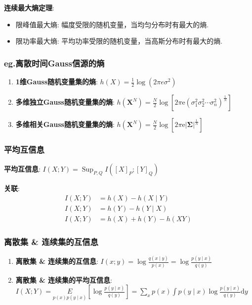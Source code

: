 \documentclass{article}
\begin{document}
            \textbf{连续最大熵定理}:
                \begin{itemize}
                    \item 限峰值最大熵: 幅度受限的随机变量，当均匀分布时有最大的熵.
                    \item 限功率最大熵: 平均功率受限的随机变量，当高斯分布时有最大的熵.
                \end{itemize}
            
        \subsubsection{\textbf{eg.}离散时间Gauss信源的熵}
            \begin{enumerate}
                \item \textbf{1维Gauss随机变量集的熵}: $h(X)=\frac{1}{2} \log \left(2 \pi e \sigma^{2}\right)$
                \item \textbf{多维独立Gauss随机变量集的熵}: $h\left(\boldsymbol{X}^{N}\right)=\frac{N}{2} \log \left[2 \pi \mathrm{e}\left(\sigma_{1}^{2} \sigma_{2}^{2} \cdots \sigma_{n}^{2}\right)^{\frac{1}{N}}\right]$
                \item \textbf{多维相关Gauss随机变量集的熵}: $h\left(\boldsymbol{X}^{N}\right)=\frac{N}{2} \log \left[2 \pi \mathrm{e} |\boldsymbol \Sigma|^{\frac{1}{N}}\right]$
            \end{enumerate}
            
        \subsubsection{平均互信息}
            \textbf{平均互信息}: $I(X ; Y)=\operatorname{Sup}_{P, Q} I\left([X]_{P} ;[Y]_{Q}\right)$
            
            \textbf{关联}:
                \begin{align*}
                    I(X ; Y) &= h(X)-h(X \mid Y) \\
                    I(X ; Y) &= h(Y)-h(Y \mid X) \\
                    I(X ; Y) &= h(X)+h(Y)-h(X Y)
                \end{align*}
                
        \subsubsection{离散集 \& 连续集的互信息}
            \begin{enumerate}
                \item \textbf{离散集 \& 连续集的互信息}: $I(x ; y)=\log \frac{q(x \mid y)}{p(x)}=\log \frac{p(y \mid x)}{q(y)}$
                \item \textbf{离散集 \& 连续集的平均互信息}: $I(X ; Y)=\underset{p(x) p(y \mid x)}{E}\left[\log \frac{p(y \mid x)}{q(y)}\right]=\sum_{x} p(x) \int p(y \mid x) \log \frac{p(y \mid x)}{q(y)} \mathrm{d} y$
            \end{enumerate}
            
\end{document}
